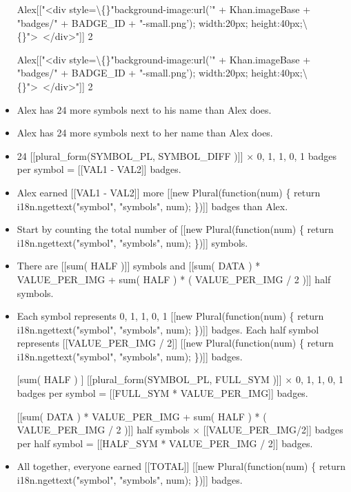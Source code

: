 \documentclass{article}
\begin{document}
\begin{itemize}
                        Alex[["<div style=\textbackslash\{\}"background-image:url('" + Khan.imageBase + "badges/" + BADGE\_ID + "-small.png'); width:20px; height:40px;\textbackslash\{\}"> </div>"]]
                        2
                         
                    
                    
                        Alex[["<div style=\textbackslash\{\}"background-image:url('" + Khan.imageBase + "badges/" + BADGE\_ID + "-small.png'); width:20px; height:40px;\textbackslash\{\}"> </div>"]]
                        2
  \item Alex has 24 more symbols next to his name than Alex does.
  \item Alex has 24 more symbols next to her name than Alex does.
  \item 24 [[plural\_form(SYMBOL\_PL, SYMBOL\_DIFF )]]
                         $\times$ 
                        0, 1, 1, 0, 1 badges per symbol
                         = [[VAL1 - VAL2]] badges.
  \item Alex earned [[VAL1 - VAL2]] more [[new Plural(function(num) \{
            return i18n.ngettext("symbol", "symbols", num);
        \})]] badges than Alex.
  \item Start by counting the total number of [[new Plural(function(num) \{
            return i18n.ngettext("symbol", "symbols", num);
        \})]] symbols.
  \item There are [[sum( HALF )]] symbols and [[sum( DATA ) * VALUE\_PER\_IMG + sum( HALF ) * ( VALUE\_PER\_IMG / 2 )]] half symbols.
  \item Each symbol represents 0, 1, 1, 0, 1 [[new Plural(function(num) \{
            return i18n.ngettext("symbol", "symbols", num);
        \})]] badges.
                    Each half symbol represents [[VALUE\_PER\_IMG / 2]] [[new Plural(function(num) \{
            return i18n.ngettext("symbol", "symbols", num);
        \})]] badges.
  \item [[sum( HALF )]] [[plural\_form(SYMBOL\_PL, FULL\_SYM )]]
                         $\times$ 
                        0, 1, 1, 0, 1 badges per symbol
                         = [[FULL\_SYM * VALUE\_PER\_IMG]] badges.
                        
                            [[sum( DATA ) * VALUE\_PER\_IMG + sum( HALF ) * ( VALUE\_PER\_IMG / 2 )]] half symbols
                             $\times$ [[VALUE\_PER\_IMG/2]] badges per half symbol
                             = [[HALF\_SYM * VALUE\_PER\_IMG / 2]]
                            badges.
  \item All together, everyone earned [[TOTAL]] [[new Plural(function(num) \{
            return i18n.ngettext("symbol", "symbols", num);
        \})]] badges.
\end{itemize}
\end{document}
